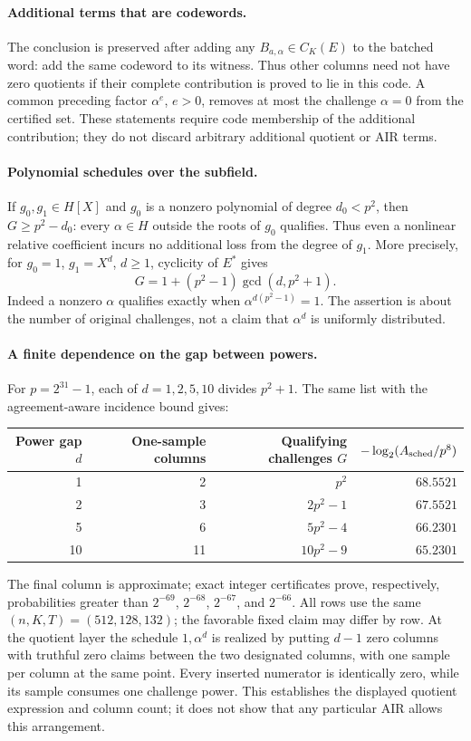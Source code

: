 \documentclass[11pt,letterpaper]{article}
\theoremstyle{definition}
\theoremstyle{remark}
\begin{document}
\paragraph{Additional terms that are codewords.}
The conclusion is preserved after adding any
$B_{a,\alpha}\in C_K(E)$ to the batched word: add the same codeword
to its witness. Thus other columns need not have zero quotients if
their complete contribution is proved to lie in this code. A common
preceding factor $\alpha^e$, $e>0$, removes at most the challenge
$\alpha=0$ from the certified set. These statements require code
membership of the additional contribution; they do not discard
arbitrary additional quotient or AIR terms.

\paragraph{Polynomial schedules over the subfield.}
If $g_0,g_1\in H[X]$ and $g_0$ is a nonzero polynomial of degree
$d_0<p^2$, then $G\ge p^2-d_0$: every $\alpha\in H$ outside the
roots of $g_0$ qualifies. Thus even a nonlinear relative coefficient
incurs no additional loss from the degree of $g_1$. More precisely,
for $g_0=1$, $g_1=X^d$, $d\ge1$, cyclicity of $E^*$ gives
\begin{equation}\label{eq:power-schedule-count}
 G=1+(p^2-1)\gcd(d,p^2+1).
\end{equation}
Indeed a nonzero $\alpha$ qualifies exactly when
$\alpha^{d(p^2-1)}=1$. The assertion is about the number of original
challenges, not a claim that $\alpha^d$ is uniformly distributed.

\paragraph{A finite dependence on the gap between powers.}
For $p=2^{31}-1$, each of $d=1,2,5,10$ divides $p^2+1$.
The same list with the agreement-aware incidence bound gives:
\begin{center}
\begin{tabular}{rrrr}
\toprule
Power gap $d$ & One-sample columns & Qualifying challenges $G$
 & $-\log_2(A_{\rm sched}/p^8)$\\
\midrule
1 & 2 & $p^2$ & $68.5521$\\
2 & 3 & $2p^2-1$ & $67.5521$\\
5 & 6 & $5p^2-4$ & $66.2301$\\
10 & 11 & $10p^2-9$ & $65.2301$\\
\bottomrule
\end{tabular}
\end{center}
The final column is approximate; exact integer certificates prove,
respectively, probabilities greater than $2^{-69}$, $2^{-68}$,
$2^{-67}$, and $2^{-66}$. All rows use the same
$(n,K,T)=(512,128,132)$; the favorable fixed claim may differ by row.
At the quotient layer the schedule $1,\alpha^d$ is realized by putting
$d-1$ zero columns with truthful zero claims between the two designated
columns, with one sample per column at the same point. Every inserted
numerator is identically zero, while its sample consumes one challenge
power. This establishes the displayed quotient expression and column
count; it does not show that any particular AIR allows this arrangement.
\end{document}
